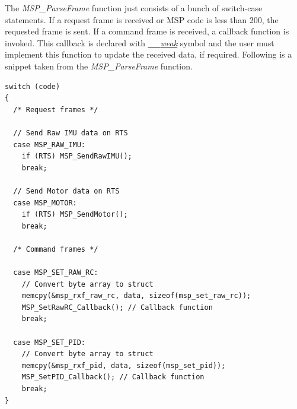 \documentclass[a4paper,12pt,oneside]{book}
\begin{document}
The \textit{MSP{\_}ParseFrame} function just consists of a bunch of switch-case statements. If a request frame is received or MSP code is less than 200, the requested frame is sent. If a command frame is received, a callback function is invoked. This callback is declared with \href{http://www.keil.com/support/man/docs/armcc/armcc_chr1359124970859.htm}{\textit{{\_\_}weak}} symbol and the user must implement this function to update the received data, if required. Following is a snippet taken from the \textit{MSP{\_}ParseFrame} function.\\

\begin{verbatim}
switch (code)
{
  /* Request frames */

  // Send Raw IMU data on RTS
  case MSP_RAW_IMU:
    if (RTS) MSP_SendRawIMU();													
    break;

  // Send Motor data on RTS
  case MSP_MOTOR:
    if (RTS) MSP_SendMotor();													
    break;
    
  /* Command frames */
  
  case MSP_SET_RAW_RC:
    // Convert byte array to struct
    memcpy(&msp_rxf_raw_rc, data, sizeof(msp_set_raw_rc));
    MSP_SetRawRC_Callback(); // Callback function
    break;

  case MSP_SET_PID:
    // Convert byte array to struct
    memcpy(&msp_rxf_pid, data, sizeof(msp_set_pid));
    MSP_SetPID_Callback(); // Callback function
    break;  
}
\end{verbatim}

\clearpage
\end{document}
